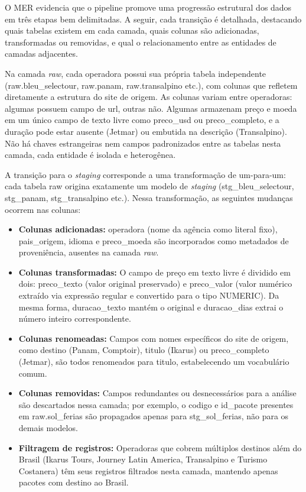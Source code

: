 O MER evidencia que o pipeline promove uma progressão estrutural dos dados em
três etapas bem delimitadas. A seguir, cada transição é detalhada, destacando quais
tabelas existem em cada camada, quais colunas são adicionadas, transformadas ou
removidas, e qual o relacionamento entre as entidades de camadas adjacentes.

Na camada \textit{raw}, cada operadora possui sua própria tabela independente
(raw.bleu\_selectour, raw.panam, raw.transalpino etc.),
com colunas que refletem diretamente a estrutura do site de origem. As colunas
variam entre operadoras: algumas possuem campo de url, outras não.
Algumas armazenam preço e moeda em um único campo de texto livre como
preco\_usd ou preco\_completo, e a duração pode estar ausente
(Jetmar) ou embutida na descrição (Transalpino). Não há chaves estrangeiras nem
campos padronizados entre as tabelas nesta camada, cada entidade é isolada e
heterogênea.

A transição para o \textit{staging} corresponde a uma transformação de
um-para-um: cada tabela raw origina exatamente um modelo de
\textit{staging} (stg\_bleu\_selectour, stg\_panam,
stg\_transalpino etc.). Nessa transformação, as seguintes mudanças
ocorrem nas colunas:

\begin{itemize}
    \item \textbf{Colunas adicionadas:} operadora (nome da agência como
    literal fixo), pais\_origem, idioma e preco\_moeda
    são incorporados como metadados de proveniência, ausentes na camada \textit{raw}.

    \item \textbf{Colunas transformadas:} O campo de preço em texto livre é
    dividido em dois: preco\_texto (valor original preservado) e
    preco\_valor (valor numérico extraído via expressão regular e
    convertido para o tipo NUMERIC). Da mesma forma, duracao\_texto
    mantém o original e duracao\_dias extrai o número inteiro correspondente.

    \item \textbf{Colunas renomeadas:} Campos com nomes específicos do site de
    origem, como destino (Panam, Comptoir), titulo (Ikarus) ou
    preco\_completo (Jetmar), são todos renomeados para titulo,
    estabelecendo um vocabulário comum.

    \item \textbf{Colunas removidas:} Campos redundantes ou desnecessários para
    a análise são descartados nessa camada; por exemplo, o codigo e
    id\_pacote presentes em raw.sol\_ferias são propagados apenas
    para stg\_sol\_ferias, não para os demais modelos.

    \item \textbf{Filtragem de registros:} Operadoras que cobrem múltiplos
    destinos além do Brasil (Ikarus Tours, Journey Latin America, Transalpino
    e Turismo Costanera) têm seus registros filtrados nesta camada, mantendo
    apenas pacotes com destino ao Brasil.
\end{itemize}

